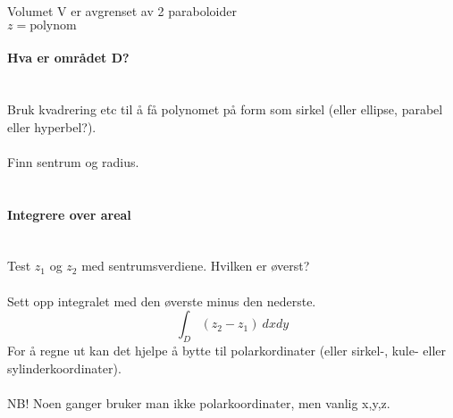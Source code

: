 Volumet V er avgrenset av 2 paraboloider\\

$z = \text{polynom}$



\paragraph{Hva er området D?} \mbox{} \\
Bruk kvadrering etc til å få polynomet på form som
sirkel (eller ellipse, parabel eller hyperbel?). \\\\
Finn sentrum og radius.\\\\



\paragraph{Integrere over areal} \mbox{} \\
Test $z_1$ og $z_2$ med sentrumsverdiene. Hvilken er øverst?\\\\
Sett opp integralet med den øverste minus den nederste.
$$\int_D (z_2 - z_1) \: dx dy$$
For å regne ut kan det hjelpe å bytte til polarkordinater
(eller sirkel-, kule- eller sylinderkoordinater).
\\\\
NB! Noen ganger bruker man ikke polarkoordinater, men vanlig x,y,z.
